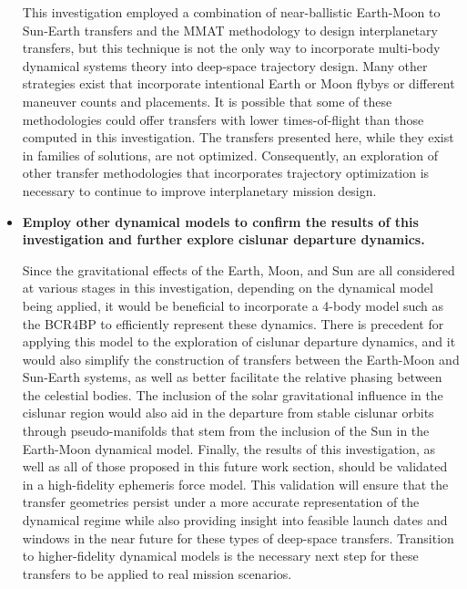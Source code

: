 \begin{itemize}
            This investigation employed a combination of near-ballistic Earth-Moon to Sun-Earth
            transfers and the MMAT methodology to design interplanetary transfers, but this
            technique is not the only way to incorporate multi-body dynamical systems theory into
            deep-space trajectory design. Many other strategies exist that incorporate intentional
            Earth or Moon flybys or different maneuver counts and placements. It is possible that
            some of these methodologies could offer transfers with lower times-of-flight than those
            computed in this investigation. The transfers presented here, while they exist in
            families of solutions, are not optimized. Consequently, an exploration of other
            transfer methodologies that incorporates trajectory optimization is necessary to
            continue to improve interplanetary mission design.
    \item   \textbf{Employ other dynamical models to confirm the results of this investigation and
            further explore cislunar departure dynamics.}

            Since the gravitational effects of the Earth, Moon, and Sun are all considered at
            various stages in this investigation, depending on the dynamical model being applied,
            it would be beneficial to incorporate a 4-body model such as the BCR4BP to efficiently
            represent these dynamics. There is precedent for applying this model to the exploration
            of cislunar departure dynamics, and it would also simplify the construction of
            transfers between the Earth-Moon and Sun-Earth systems, as well as better facilitate
            the relative phasing between the celestial bodies\cite{Boudad:2021,Boudad:2022}. The
            inclusion of the solar gravitational influence in the cislunar region would also aid in
            the departure from stable cislunar orbits through pseudo-manifolds that stem from the
            inclusion of the Sun in the Earth-Moon dynamical model. Finally, the results of this
            investigation, as well as all of those proposed in this future work section, should be
            validated in a high-fidelity ephemeris force model. This validation will ensure that
            the transfer geometries persist under a more accurate representation of the dynamical
            regime while also providing insight into feasible launch dates and windows in the near
            future for these types of deep-space transfers. Transition to higher-fidelity dynamical
            models is the necessary next step for these transfers to be applied to real mission
            scenarios.
\end{itemize}
